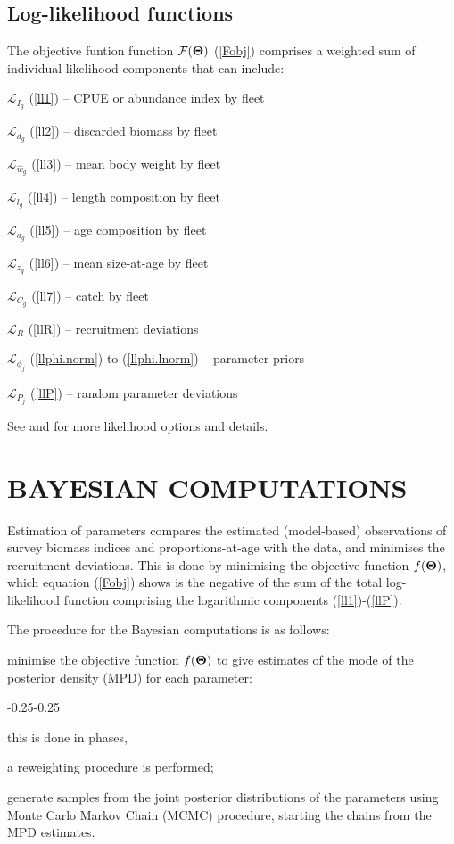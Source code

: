 \documentclass[11pt]{book}
\newcommand{\Lagr}{\mathcal{L}}%
\newcommand{\Fobj}{\mathcal{F}}%
\def\bfTh{{\bf \Theta}}%
\def\bfTh{{\bf \Theta}}          %
\newcommand{\eref}[1]{(\ref{#1})}
\begin{document}
\subsection{Log-likelihood functions}

The objective funtion function $\Fobj(\bfTh)$ \eref{Fobj} comprises a weighted sum of individual likelihood components that can include:
\begin{itemize_csas}{}{}
  \item $\Lagr_{I_g}$ \eref{ll1} -- CPUE or abundance index by fleet
  \item $\Lagr_{d_g}$ \eref{ll2} -- discarded biomass by fleet
  \item $\Lagr_{\widehat{w}_g}$ \eref{ll3} -- mean body weight by fleet
  \item $\Lagr_{l_g}$ \eref{ll4} -- length composition by fleet
  \item $\Lagr_{a_g}$ \eref{ll5} -- age composition by fleet
  \item $\Lagr_{z_g}$ \eref{ll6} -- mean size-at-age by fleet
  \item $\Lagr_{C_g}$ \eref{ll7} -- catch by fleet
  \item $\Lagr_{R}$ \eref{llR}   --  recruitment deviations
  \item $\Lagr_{\phi_j}$ \eref{llphi.norm} to \eref{llphi.lnorm} -- parameter priors
  \item $\Lagr_{P_j}$ \eref{llP} -- random parameter deviations
\end{itemize_csas}
See \citet{Methot-Wetzel:2013} and \citet{Methot-etal:2020} for more likelihood options and details.

\section{BAYESIAN COMPUTATIONS}

Estimation of parameters compares the estimated (model-based) observations of survey biomass indices and proportions-at-age with the data, and minimises the recruitment deviations. 
This is done by minimising the objective function $f(\bfTh)$, which equation \eref{Fobj} shows is the negative of the sum of the total log-likelihood function comprising the logarithmic components \eref{ll1}-\eref{llP}.

The procedure for the Bayesian computations is as follows:
\begin{enumerate_itemize}{}{}
  \item minimise the objective function $f(\bfTh)$ to give estimates of the mode of the posterior density (MPD) for each parameter:
  \begin{enumerate_itemize}{-0.25}{-0.25}
    \item this is done in phases,
    \item a reweighting procedure is performed;
  \end{enumerate_itemize}
  \item generate samples from the joint posterior distributions of the parameters using Monte Carlo Markov Chain (MCMC) procedure, starting the chains from the MPD estimates.
\end{enumerate_itemize}
\end{document}

